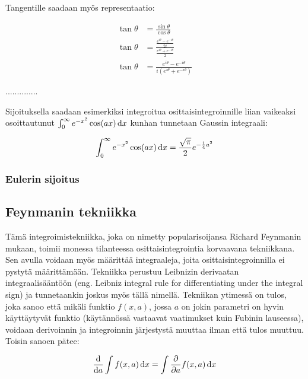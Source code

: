\documentclass[../integrointiopas.tex]{subfiles}
\begin{document}
	Tangentille saadaan myös representaatio:
	
	\begin{align}
		\tan\theta &= \frac{\sin\theta}{\cos\theta} \\
		\tan\theta &= \frac{\frac{e^{i\theta} - e^{-i\theta}}{2i}}{\frac{e^{i\theta} + e^{-i\theta}}{2}} \\
		\tan\theta &= \frac{e^{i\theta} - e^{-i\theta}}{i(e^{i\theta} + e^{-i\theta})}
	\end{align}

	..............

	Sijoituksella saadaan esimerkiksi integroitua osittaisintegroinnille liian vaikeaksi osoittautunut $\int_{0}^{\infty}e^{-x^2}\cos(ax)\odif{x}$ kunhan tunnetaan Gaussin integraali:
	
	\begin{equation}
		\int_{0}^{\infty}e^{-x^2}\cos(ax)\odif{x} = \frac{\sqrt{\pi}}{2}e^{-\frac{1}{4}a^2}
	\end{equation}

	\subsubsection{Eulerin sijoitus}
	

	
	
	
	\subsection{Feynmanin tekniikka}
	
	Tämä integroimistekniikka, joka on nimetty popularisoijansa Richard Feynmanin mukaan, toimii monessa tilanteessa osittaisintegrointia korvaavana tekniikkana. Sen avulla voidaan myös määrittää integraaleja, joita osittaisintegroinnilla ei pystytä määrittämään. Tekniikka perustuu Leibnizin derivaatan integraalisääntöön (eng. Leibniz integral rule for differentiating under the integral sign) ja tunnetaankin joskus myös tällä nimellä. Tekniikan ytimessä on tulos, joka sanoo että mikäli funktio $f(x,a)$, jossa $a$ on jokin parametri on hyvin käyttäytyvät funktio (käytännössä vastaavat vaatimukset kuin Fubinin lauseessa), voidaan derivoinnin ja integroinnin järjestystä muuttaa ilman että tulos muuttuu. Toisin sanoen pätee:
	
	\begin{equation}
		\odv{}{a}\int f(x,a)\odif{x} = \int\pdv{}{a}f(x, a)\odif{x}
	\end{equation}
\end{document}
